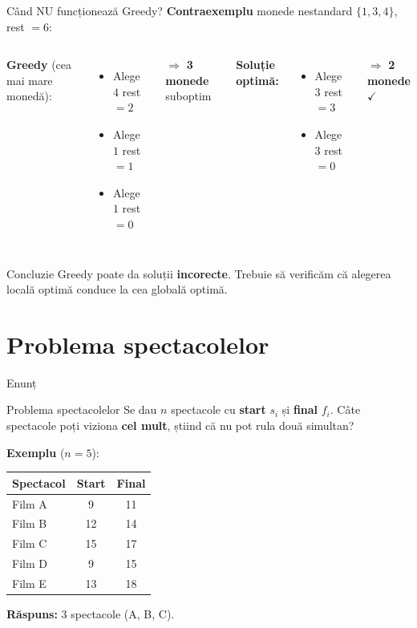 \documentclass{beamer}
\begin{document}
\begin{frame}{Când NU funcționează Greedy?}
  \textbf{Contraexemplu} \textemdash{} monede nestandard $\{1, 3, 4\}$, rest $= 6$:
  \smallskip
  \begin{columns}[T]
    \textbf{Greedy} (cea mai mare monedă):
    \begin{itemize}\itemsep4pt
      \item Alege $4$ \quad rest $= 2$
      \item Alege $1$ \quad rest $= 1$
      \item Alege $1$ \quad rest $= 0$
    \end{itemize}
    \smallskip
    $\Rightarrow$ \textbf{3 monede} \quad \alert{suboptim}

    \textbf{Soluție optimă:}
    \begin{itemize}\itemsep4pt
      \item Alege $3$ \quad rest $= 3$
      \item Alege $3$ \quad rest $= 0$
    \end{itemize}
    \smallskip
    $\Rightarrow$ \textbf{2 monede} \quad $\checkmark$
  \end{columns}
  \smallskip
  \begin{alertblock}{Concluzie}
    Greedy poate da soluții \textbf{incorecte}.
    Trebuie să verificăm că alegerea locală optimă
    conduce la cea globală optimă.
  \end{alertblock}
\end{frame}

\section{Problema spectacolelor}

\begin{frame}{Enunț}
  \begin{block}{Problema spectacolelor}
    Se dau $n$ spectacole cu \textbf{start} $s_i$ și \textbf{final} $f_i$.
    Câte spectacole poți viziona \textbf{cel mult},
    știind că nu pot rula două simultan?
  \end{block}
  \textbf{Exemplu} ($n = 5$):
  \begin{center}
  \begin{tabular}{lcc}
    \toprule
    Spectacol & Start & Final \\
    \midrule
    Film A & 9  & 11 \\
    Film B & 12 & 14 \\
    Film C & 15 & 17 \\
    Film D & 9  & 15 \\
    Film E & 13 & 18 \\
    \bottomrule
  \end{tabular}
  \end{center}
  \textbf{Răspuns:} $3$ spectacole (A, B, C).
\end{frame}
\end{document}
